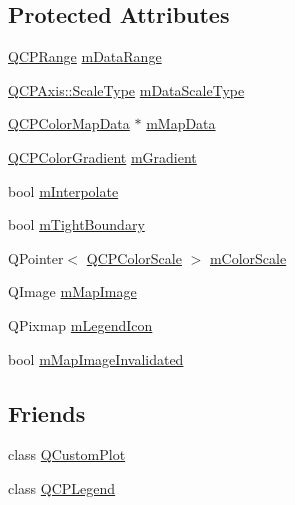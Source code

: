 \subsection*{Protected Attributes}
\begin{DoxyCompactItemize}
\item 
\hyperlink{class_q_c_p_range}{Q\+C\+P\+Range} \hyperlink{class_q_c_p_color_map_ab87609621d16cd3e9d52ad070b327b08}{m\+Data\+Range}
\item 
\hyperlink{class_q_c_p_axis_a36d8e8658dbaa179bf2aeb973db2d6f0}{Q\+C\+P\+Axis\+::\+Scale\+Type} \hyperlink{class_q_c_p_color_map_ab28a4b2def408f83b9818799d5f18446}{m\+Data\+Scale\+Type}
\item 
\hyperlink{class_q_c_p_color_map_data}{Q\+C\+P\+Color\+Map\+Data} $\ast$ \hyperlink{class_q_c_p_color_map_a8709272aa8f0be3ca111bf3866806f8b}{m\+Map\+Data}
\item 
\hyperlink{class_q_c_p_color_gradient}{Q\+C\+P\+Color\+Gradient} \hyperlink{class_q_c_p_color_map_aab77fe9a8df6f0486ab3507cc5f278fa}{m\+Gradient}
\item 
bool \hyperlink{class_q_c_p_color_map_af77e5eba9a844592648edeb6fbe834f1}{m\+Interpolate}
\item 
bool \hyperlink{class_q_c_p_color_map_ac2e9425fe4381b496726e1c09f978302}{m\+Tight\+Boundary}
\item 
Q\+Pointer$<$ \hyperlink{class_q_c_p_color_scale}{Q\+C\+P\+Color\+Scale} $>$ \hyperlink{class_q_c_p_color_map_a95b4100bacc3387652c988b071ec9db7}{m\+Color\+Scale}
\item 
Q\+Image \hyperlink{class_q_c_p_color_map_a66110813b42eca78b64095b2a1f285a0}{m\+Map\+Image}
\item 
Q\+Pixmap \hyperlink{class_q_c_p_color_map_ada522988db02cb531767d38c5029ef60}{m\+Legend\+Icon}
\item 
bool \hyperlink{class_q_c_p_color_map_ac9aea6a5c193d7fa866bc7b26e79ef2c}{m\+Map\+Image\+Invalidated}
\end{DoxyCompactItemize}
\subsection*{Friends}
\begin{DoxyCompactItemize}
\item 
class \hyperlink{class_q_c_p_color_map_a1cdf9df76adcfae45261690aa0ca2198}{Q\+Custom\+Plot}
\item 
class \hyperlink{class_q_c_p_color_map_a8429035e7adfbd7f05805a6530ad5e3b}{Q\+C\+P\+Legend}
\end{DoxyCompactItemize}

